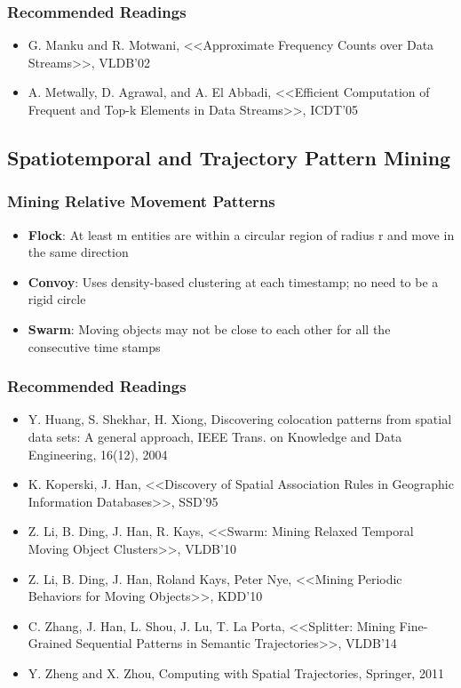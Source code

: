 \subsubsection{Recommended Readings}
\begin{itemize}
\item G. Manku and R. Motwani, <<Approximate Frequency Counts over Data
Streams>>, VLDB’02
\item A. Metwally, D. Agrawal, and A. El Abbadi, <<Efficient Computation of Frequent and Top-k Elements in Data Streams>>, ICDT'05
\end{itemize}

\subsection{Spatiotemporal and Trajectory Pattern Mining}
\subsubsection{Mining Relative Movement Patterns}
\begin{itemize}
\item \textbf{Flock}: At least m entities are within a circular region of radius r and move in the same direction
\item \textbf{Convoy}: Uses density-based clustering at each timestamp; no need to be a rigid circle
\item \textbf{Swarm}: Moving objects may not be close to each other for all the consecutive time stamps
\end{itemize}


\subsubsection{Recommended Readings}
\begin{itemize}
\item Y. Huang, S. Shekhar, H. Xiong, Discovering colocation patterns from spatial data sets: A general approach, IEEE Trans. on Knowledge and Data Engineering, 16(12), 2004
\item K. Koperski, J. Han, <<Discovery of Spatial Association Rules in Geographic Information Databases>>, SSD’95
\item Z. Li, B. Ding, J. Han, R. Kays, <<Swarm: Mining Relaxed Temporal Moving Object Clusters>>, VLDB’10
\item Z. Li, B. Ding, J. Han, Roland Kays, Peter Nye, <<Mining Periodic Behaviors for Moving Objects>>, KDD’10
\item C. Zhang, J. Han, L. Shou, J. Lu, T. La Porta, <<Splitter: Mining Fine-Grained Sequential Patterns in Semantic Trajectories>>, VLDB’14
\item Y. Zheng and X. Zhou, Computing with Spatial Trajectories, Springer, 2011
\end{itemize}


